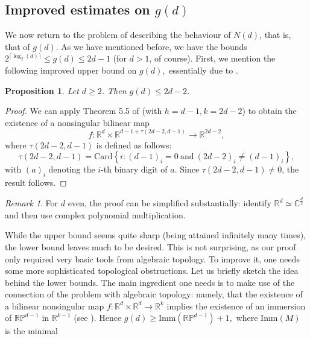 \documentclass[11pt, a4paper, reqno]{elsarticle}
\newtheorem{proposition}{Proposition}[section]
\theoremstyle{definition}
\theoremstyle{remark}
\newtheorem{remark}{Remark}
\begin{document}
\subsection{Improved estimates on \texorpdfstring{$g(d)$}{g(d)}}\label{sec : hardertopalg}
We now return to the problem of describing the behaviour
of $N(d)$, that is, that of $g(d)$. 
As we have mentioned before, we have the bounds $2^{\lceil \log_2(d)\rceil}\le 
g(d)\le 2d-1$ (for $d>1$, of course).
First, we mention the following
improved upper bound on $g(d),$
essentially due to 
\cite{lam1968construction}.
\begin{proposition}\label{prop : bindisj}
    Let $d\ge 2$. Then $g(d)\le 2d-2$.
\end{proposition}
\begin{proof}
We can apply Theorem 5.5 of \cite{lam1968construction} 
(with $h=d-1, k=2d-2$) to obtain
the existence
of a nonsingular bilinear map
\begin{equation*}
    f\colon\mathbb{R}^d\times \mathbb{R}^{d-1+\tau(2d-2,d-1)}
    \to \mathbb R^{2d-2},
\end{equation*}
where $\tau(2d-2,d-1)$ is defined
as follows:
\begin{equation*}
    \tau(2d-2,d-1)=\mathrm{Card}
    \left\{i\colon (d-1)_i=0\ \mathrm{and }\ (2d-2)_i\neq (d-1)_i\right\},
\end{equation*}
with $(a)_i$ denoting the $i$-th binary digit of $a$.
Since $\tau(2d-2,d-1)\neq 0$, the result
follows.
\end{proof}
\begin{remark}
    For $d$ even, the proof can be simplified substantially:
    identify $\mathbb{R}^d\simeq \mathbb{C}^{\frac d2}$
    and then use complex 
    polynomial multiplication.
\end{remark}
While the upper bound seems quite sharp
(being attained infinitely many times), the lower bound leaves much to be desired.
This is not surprising, as our proof only required very basic tools from algebraic
topology. To improve it, one needs some more sophisticated 
topological obstructions. Let us briefly sketch
the idea behind the lower bounds. The main ingredient one needs
is to make use of the connection of the problem with algebraic 
topology: namely, that the existence of a bilinear nonsingular map $f\colon\mathbb{R}^d\times \mathbb{R}^d\to \mathbb{R}^k$ implies the existence of an immersion of $\mathbb{R}\mathbb P^{d-1}$ in $\mathbb{R}^{k-1}$ (see \cite{Petrovic}). Hence $g(d)\ge \text{Imm}(\mathbb R\mathbb P^{d-1})+1,$ where $\mathrm{Imm}(M)$ is the minimal 
\end{document}
